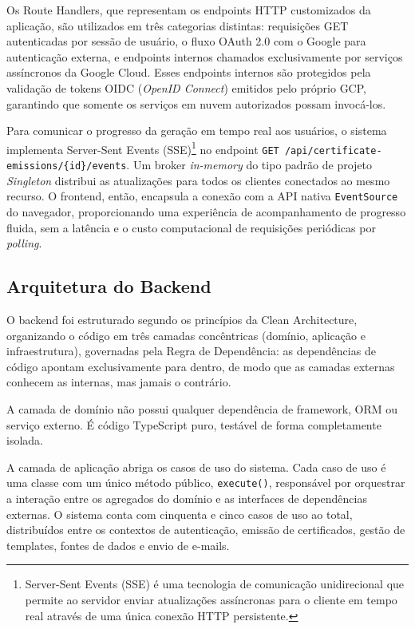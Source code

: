 \documentclass[article,a4paper,12pt,brazil,sumario=tradicional]{abntex2}
\begin{document}
Os Route Handlers, que representam os endpoints HTTP customizados da aplicação, são utilizados em três categorias distintas: requisições GET autenticadas por sessão de usuário, o fluxo OAuth 2.0 com o Google para autenticação externa, e endpoints internos chamados exclusivamente por serviços assíncronos da Google Cloud. Esses endpoints internos são protegidos pela validação de tokens OIDC (\textit{OpenID Connect}) emitidos pelo próprio GCP, garantindo que somente os serviços em nuvem autorizados possam invocá-los.

Para comunicar o progresso da geração em tempo real aos usuários, o sistema implementa Server-Sent Events (SSE)\footnote{Server-Sent Events (SSE) é uma tecnologia de comunicação unidirecional que permite ao servidor enviar atualizações assíncronas para o cliente em tempo real através de uma única conexão HTTP persistente.} no endpoint \texttt{GET /api/certificate-\allowbreak emissions/\{id\}/events}. Um broker \textit{in-memory} do tipo padrão de projeto \textit{Singleton} distribui as atualizações para todos os clientes conectados ao mesmo recurso. O frontend, então, encapsula a conexão com a API nativa \texttt{EventSource} do navegador, proporcionando uma experiência de acompanhamento de progresso fluida, sem a latência e o custo computacional de requisições periódicas por \textit{polling}.

\subsection{Arquitetura do Backend}

O backend foi estruturado segundo os princípios da Clean Architecture, organizando o código em três camadas concêntricas (domínio, aplicação e infraestrutura), governadas pela Regra de Dependência: as dependências de código apontam exclusivamente para dentro, de modo que as camadas externas conhecem as internas, mas jamais o contrário.

A camada de domínio não possui qualquer dependência de framework, ORM ou serviço externo. É código TypeScript puro, testável de forma completamente isolada.

A camada de aplicação abriga os casos de uso do sistema. Cada caso de uso é uma classe com um único método público, \texttt{execute()}, responsável por orquestrar a interação entre os agregados do domínio e as interfaces de dependências externas. O sistema conta com cinquenta e cinco casos de uso ao total, distribuídos entre os contextos de autenticação, emissão de certificados, gestão de templates, fontes de dados e envio de e-mails.
\end{document}

